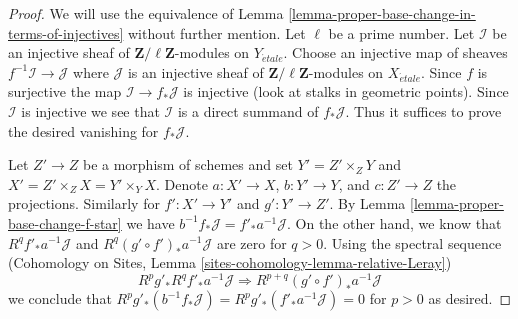 \documentclass[10pt,a4paper]{amsart}
\theoremstyle{plain}
\theoremstyle{definition}
\theoremstyle{remark}
\numberwithin{equation}{subsection}
\def\etale{{\acute{e}tale}}
\begin{document}
\begin{proof}
We will use the equivalence of
Lemma \ref{lemma-proper-base-change-in-terms-of-injectives}
without further mention. Let $\ell$ be a prime number.
Let $\mathcal{I}$ be an injective sheaf of
$\mathbf{Z}/\ell\mathbf{Z}$-modules on $Y_\etale$.
Choose an injective map of sheaves $f^{-1}\mathcal{I} \to \mathcal{J}$
where $\mathcal{J}$ is an injective sheaf of
$\mathbf{Z}/\ell\mathbf{Z}$-modules on $X_\etale$.
Since $f$ is surjective the map $\mathcal{I} \to f_*\mathcal{J}$
is injective (look at stalks in geometric points).
Since $\mathcal{I}$ is injective we see that $\mathcal{I}$
is a direct summand of $f_*\mathcal{J}$. Thus it suffices
to prove the desired vanishing for $f_*\mathcal{J}$.

\medskip\noindent
Let $Z' \to Z$ be a morphism of schemes and set
$Y' = Z' \times_Z Y$ and $X' = Z' \times_Z X = Y' \times_ Y X$.
Denote $a : X' \to X$, $b : Y' \to Y$, and $c : Z' \to Z$ the
projections. Similarly for $f' : X' \to Y'$ and $g' : Y' \to Z'$.
By Lemma \ref{lemma-proper-base-change-f-star} we have
$b^{-1}f_*\mathcal{J} = f'_*a^{-1}\mathcal{J}$.
On the other hand, we know that $R^qf'_*a^{-1}\mathcal{J}$ and
$R^q(g' \circ f')_*a^{-1}\mathcal{J}$ are zero for $q > 0$.
Using the spectral sequence
(Cohomology on Sites, Lemma \ref{sites-cohomology-lemma-relative-Leray})
$$
R^pg'_* R^qf'_* a^{-1}\mathcal{J} \Rightarrow
R^{p + q}(g' \circ f')_* a^{-1}\mathcal{J}
$$
we conclude that
$ R^pg'_*(b^{-1}f_*\mathcal{J}) = R^pg'_*(f'_*a^{-1}\mathcal{J}) = 0$
for $p > 0$ as desired.
\end{proof}
\end{document}
